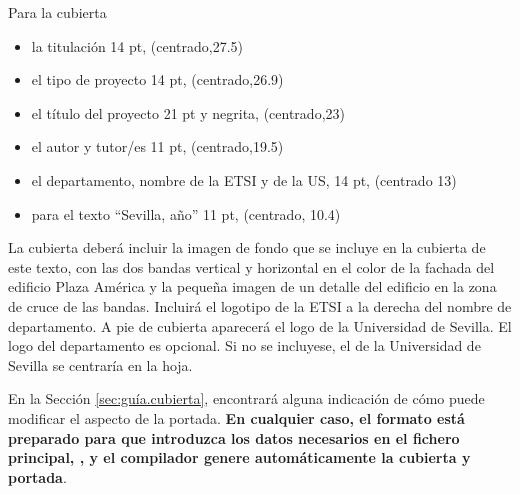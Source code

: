 Para la cubierta 
\begin{itemize}\itemsep1pt \parskip0pt 
\item la titulación 14 pt, (centrado,27.5)
\item el tipo de proyecto 14 pt, (centrado,26.9)
\item el título del proyecto 21 pt y negrita, (centrado,23)
\item el autor y tutor/es 11 pt, (centrado,19.5)
\item el departamento, nombre de la ETSI y de la US, 14 pt, (centrado 13)
\item para el texto “Sevilla, año” 11 pt, (centrado, 10.4)
\end{itemize}

La cubierta deberá incluir la imagen de fondo que se incluye en la cubierta de este texto, con las dos bandas vertical y horizontal en el color de la fachada del edificio Plaza América y la pequeña imagen de un detalle del edificio en la zona de cruce de las bandas. Incluirá el logotipo de la ETSI a la derecha del nombre de departamento. A pie de cubierta aparecerá el logo de la Universidad de Sevilla. El logo del departamento es opcional. Si no se incluyese, el de la Universidad de Sevilla se centraría en la hoja.

En la Sección \ref{sec:guía.cubierta}, encontrará alguna indicación de cómo puede modificar el aspecto de la portada. \textbf{En cualquier caso, el formato está preparado para que introduzca los datos necesarios en el fichero principal, , y el compilador genere automáticamente la cubierta y portada}.


\endinput
